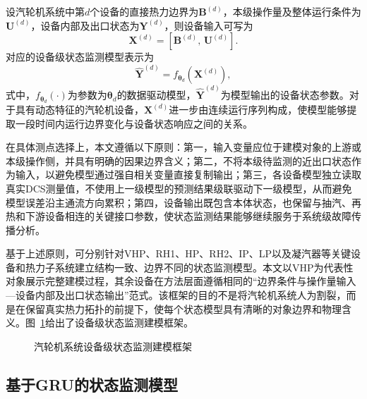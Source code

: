设汽轮机系统中第$d$个设备的直接热力边界为$\mathbf{B}^{(d)}$，本级操作量及整体运行条件为$\mathbf{U}^{(d)}$，设备内部及出口状态为$\mathbf{Y}^{(d)}$，则设备输入可写为
\begin{equation}
    \mathbf{X}^{(d)}=
    \left[
    \mathbf{B}^{(d)},\,
    \mathbf{U}^{(d)}
    \right].
    \label{eq:device_input}
\end{equation}
对应的设备级状态监测模型表示为
\begin{equation}
    \hat{\mathbf{Y}}^{(d)}=
    f_{\boldsymbol{\theta}_d}
    \left(
    \mathbf{X}^{(d)}
    \right),
    \label{eq:device_health_mapping}
\end{equation}
式中，$f_{\boldsymbol{\theta}_d}(\cdot)$为参数为$\boldsymbol{\theta}_d$的数据驱动模型，$\hat{\mathbf{Y}}^{(d)}$为模型输出的设备状态参数。对于具有动态特征的汽轮机设备，$\mathbf{X}^{(d)}$进一步由连续运行序列构成，使模型能够提取一段时间内运行边界变化与设备状态响应之间的关系。

在具体测点选择上，本文遵循以下原则：第一，输入变量应位于建模对象的上游或本级操作侧，并具有明确的因果边界含义；第二，不将本级待监测的近出口状态作为输入，以避免模型通过强自相关变量直接复制输出；第三，各设备模型独立读取真实DCS测量值，不使用上一级模型的预测结果级联驱动下一级模型，从而避免模型误差沿主通流方向累积；第四，设备输出既包含本体状态，也保留与抽汽、再热和下游设备相连的关键接口参数，使状态监测结果能够继续服务于系统级故障传播分析。

基于上述原则，可分别针对VHP、RH1、HP、RH2、IP、LP以及凝汽器等关键设备和热力子系统建立结构一致、边界不同的状态监测模型。本文以VHP为代表性对象展示完整建模过程，其余设备在方法层面遵循相同的“边界条件与操作量输入—设备内部及出口状态输出”范式。该框架的目的不是将汽轮机系统人为割裂，而是在保留真实热力拓扑的前提下，使每个状态模型具有清晰的对象边界和物理含义。图~\ref{fig:device_model_framework}给出了设备级状态监测建模框架。

\begin{figure}[htbp]
    \centering
    \caption{汽轮机系统设备级状态监测建模框架}
    \label{fig:device_model_framework}
\end{figure}

\subsection{基于GRU的状态监测模型}
\label{subsec:gru_model}

